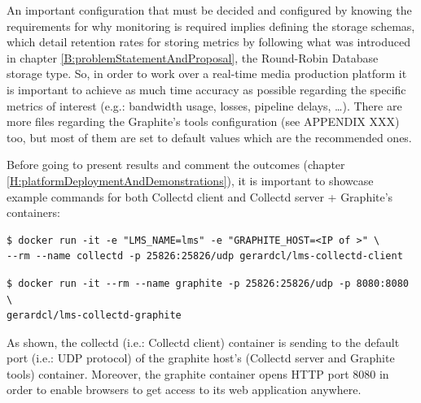 An important configuration that must be decided and configured by knowing the requirements for why monitoring is required implies defining the storage schemas, which detail retention rates for storing metrics by following what was introduced in chapter \ref{B:problemStatementAndProposal}, the Round-Robin Database storage type. So, in order to work over a real-time media production platform it is important to achieve as much time accuracy as possible regarding the specific metrics of interest (e.g.: bandwidth usage, losses, pipeline delays, \ldots). There are more files regarding the Graphite's tools configuration (see APPENDIX XXX) too, but most of them are set to default values which are the recommended ones. 

Before going to present results and comment the outcomes (chapter \ref{H:platformDeploymentAndDemonstrations}), it is important to showcase example commands for both Collectd client and Collectd server + Graphite's containers:

\begin{verbatim}
$ docker run -it -e "LMS_NAME=lms" -e "GRAPHITE_HOST=<IP of >" \
--rm --name collectd -p 25826:25826/udp gerardcl/lms-collectd-client
\end{verbatim}

\begin{verbatim}
$ docker run -it --rm --name graphite -p 25826:25826/udp -p 8080:8080 \
gerardcl/lms-collectd-graphite
\end{verbatim}

As shown, the collectd (i.e.: Collectd client) container is sending to the default port (i.e.: UDP protocol) of the graphite host's (Collectd server and Graphite tools) container. Moreover, the graphite container opens HTTP port 8080 in order to enable browsers to get access to its web application anywhere. 
